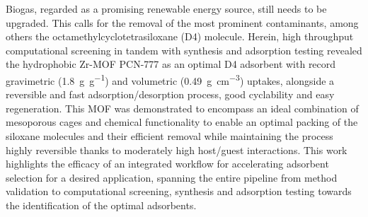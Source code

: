 
Biogas, regarded as a promising renewable energy source, still needs to be
upgraded. This calls for the removal of the most prominent contaminants, among
others the octamethylcyclotetrasiloxane (D4) molecule. Herein, high throughput
computational screening in tandem with synthesis and adsorption testing revealed
the hydrophobic Zr-MOF PCN-777 as an optimal D4 adsorbent with record
gravimetric (\SI{1.8}{\gram\per\gram}) and volumetric
(\SI{0.49}{\gram\per\centi\metre\cubed}) uptakes, alongside a reversible and
fast adsorption/desorption process, good cyclability and easy regeneration. This
MOF was demonstrated to encompass an ideal combination of mesoporous cages and
chemical functionality to enable an optimal packing of the siloxane molecules
and their efficient removal while maintaining the process highly reversible
thanks to moderately high host/guest interactions. This work highlights the
efficacy of an integrated workflow for accelerating adsorbent selection for a
desired application, spanning the entire pipeline from method validation to
computational screening, synthesis and adsorption testing towards the
identification of the optimal adsorbents.
